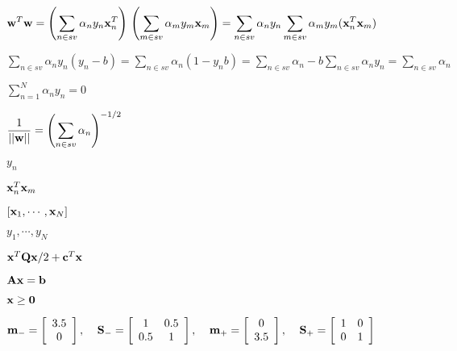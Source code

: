 \documentclass{article}
\def\lthtmlcheckvsize{\ifdim\ht\sizebox<\vsize 
  \ifdim\wd\sizebox<\hsize\expandafter\hfill\fi \expandafter\vfill
  \else\expandafter\vss\fi}%
\begin{document}
{\newpage\clearpage
{}%
$\displaystyle {\bf w}^T {\bf w}
=\left(\sum_{n\in sv} \alpha_n y_n {\bf x}^T_n\right)\,
\left(\sum_{m\in sv} \alpha_m y_m {\bf x}_m\right)
=\sum_{n\in sv} \alpha_n y_n \sum_{m\in sv} \alpha_m y_m ({\bf x}^T_n{\bf x}_m)$%
\lthtmlindisplaymathZ
\lthtmlcheckvsize\clearpage}

{\newpage\clearpage
{}%
$\displaystyle \sum_{n\in sv} \alpha_n y_n (y_n-b)=\sum_{n\in sv} \alpha_n (1-y_n b)
=\sum_{n\in sv} \alpha_n - b\sum_{n\in sv} \alpha_n y_n=\sum_{n\in sv} \alpha_n$%
\lthtmlindisplaymathZ
\lthtmlcheckvsize\clearpage}

{\newpage\clearpage
{}%
$ \sum_{n=1}^N \alpha_n y_n=0$%
\lthtmlindisplaymathZ
\lthtmlcheckvsize\clearpage}

{\newpage\clearpage
{}%
$\displaystyle \frac{1}{||{\bf w}||}=\left(\sum_{n\in sv} \alpha_n\right)^{-1/2}$%
\lthtmlindisplaymathZ
\lthtmlcheckvsize\clearpage}

{\newpage\clearpage
{}%
$ y_n$%
\lthtmlindisplaymathZ
\lthtmlcheckvsize\clearpage}

{\newpage\clearpage
{}%
$ {\bf x}_n^T{\bf x}_m$%
\lthtmlindisplaymathZ
\lthtmlcheckvsize\clearpage}

{\newpage\clearpage
{}%
$ [{\bf x}_1,\cdots,{\bf x}_N]$%
\lthtmlindisplaymathZ
\lthtmlcheckvsize\clearpage}

{\newpage\clearpage
{}%
$ y_1,\cdots,y_N$%
\lthtmlindisplaymathZ
\lthtmlcheckvsize\clearpage}

{\newpage\clearpage
{}%
$ {\bf x}^T{\bf Qx}/2+{\bf c}^T{\bf x}$%
\lthtmlindisplaymathZ
\lthtmlcheckvsize\clearpage}

{\newpage\clearpage
{}%
$ {\bf Ax}={\bf b}$%
\lthtmlindisplaymathZ
\lthtmlcheckvsize\clearpage}

{\newpage\clearpage
{}%
$ {\bf x}\ge {\bf0}$%
\lthtmlindisplaymathZ
\lthtmlcheckvsize\clearpage}

{\newpage\clearpage
{}%
$\displaystyle {\bf m}_-=\left[\begin{array}{c}3.5\\0\end{array}\right],\;\;\;\;
{\bf S}_-=\left[\begin{array}{cc}1&0.5\\0.5&1\end{array}\right],\;\;\;\;
{\bf m}_+=\left[\begin{array}{c}0\\3.5\end{array}\right],\;\;\;\;
{\bf S}_+=\left[\begin{array}{cc}1&0\\0&1\end{array}\right]$%
\lthtmlindisplaymathZ
\lthtmlcheckvsize\clearpage}
\end{document}
